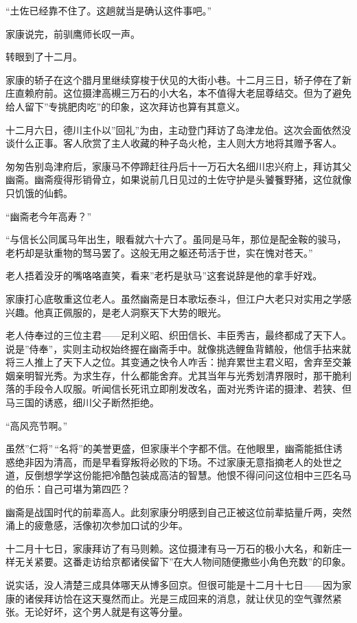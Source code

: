 \documentclass[
]{book}
\begin{document}
``土佐已经靠不住了。这趟就当是确认这件事吧。''

家康说完，前驯鹰师长叹一声。

转眼到了十二月。

家康的轿子在这个腊月里继续穿梭于伏见的大街小巷。十二月三日，轿子停在了新庄直赖府前。这位摄津高槻三万石的小大名，本不值得大老屈尊结交。但为了避免给人留下''专挑肥肉吃''的印象，这次拜访也算有其意义。

十二月六日，德川主仆以''回礼''为由，主动登门拜访了岛津龙伯。这次会面依然没谈什么正事。客人欣赏了主人收藏的种子岛火枪，主人则大方地将其赠予客人。

匆匆告别岛津府后，家康马不停蹄赶往丹后十一万石大名细川忠兴府上，拜访其父幽斋。幽斋瘦得形销骨立，如果说前几日见过的土佐守护是头饕餮野猪，这位就像只饥饿的仙鹤。

``幽斋老今年高寿？''

``与信长公同属马年出生，眼看就六十六了。虽同是马年，那位是配金鞍的骏马，老朽却是驮重物的驽马罢了。这般无用之躯还苟活于世，实在愧对苍天。''

老人捂着没牙的嘴咯咯直笑，看来''老朽是驮马''这套说辞是他的拿手好戏。

家康打心底敬重这位老人。虽然幽斋是日本歌坛泰斗，但江户大老只对实用之学感兴趣。他真正佩服的，是老人洞察天下大势的眼光。

老人侍奉过的三位主君------足利义昭、织田信长、丰臣秀吉，最终都成了天下人。说是''侍奉''，实则主动权始终握在幽斋手中。就像挑选鲤鱼背鳍般，他信手拈来就将三人推上了天下人之位。其变通之快令人咋舌：抛弃累世主君义昭，舍弃至交兼姻亲明智光秀。为求生存，什么都能舍弃。尤其当年与光秀划清界限时，那干脆利落的手段令人叹服。听闻信长死讯立即削发改名，面对光秀许诺的摄津、若狭、但马三国的诱惑，细川父子断然拒绝。

``高风亮节啊。''

虽然''仁将''\,``名将''的美誉更盛，但家康半个字都不信。在他眼里，幽斋能抵住诱惑绝非因为清高，而是早看穿叛将必败的下场。不过家康无意指摘老人的处世之道，反倒想学学这份能把冷酷包装成高洁的智慧。他恨不得问问这位相中三匹名马的伯乐：自己可堪为第四匹？

幽斋是战国时代的前辈高人。此刻家康分明感到自己正被这位前辈掂量斤两，突然涌上的疲惫感，活像初次参加口试的少年。

十二月十七日，家康拜访了有马则赖。这位摄津有马一万石的极小大名，和新庄一样无关紧要。这番走访给京都诸侯留下''在大人物间随便撒些小角色充数''的印象。

说实话，没人清楚三成具体哪天从博多回京。但很可能是十二月十七日------因为家康的诸侯拜访恰在这天戛然而止。光是三成回来的消息，就让伏见的空气骤然紧张。无论好坏，这个男人就是有这等分量。
\end{document}
